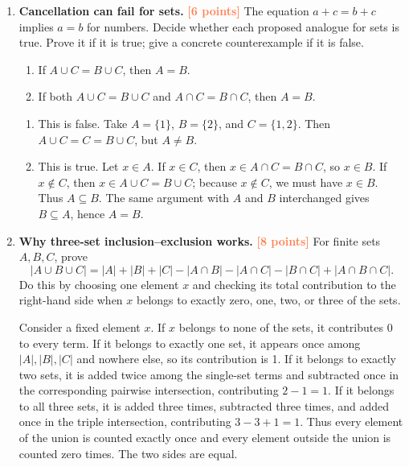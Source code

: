 \documentclass[11pt]{article}
\newcommand{\points}[1]{\hfill\textcolor{coral}{\small\bfseries[#1 points]}}
\begin{document}
\begin{enumerate}[resume]
\item \textbf{Cancellation can fail for sets.} \points{6}
The equation $a+c=b+c$ implies $a=b$ for numbers. Decide whether each proposed
analogue for sets is true. Prove it if it is true; give a concrete
counterexample if it is false.
\begin{enumerate}
  \item If $A\cup C=B\cup C$, then $A=B$.
  \item If both $A\cup C=B\cup C$ and $A\cap C=B\cap C$, then $A=B$.
\end{enumerate}
\begin{solution}
\begin{enumerate}
  \item This is false. Take $A=\{1\}$, $B=\{2\}$, and $C=\{1,2\}$.
  Then $A\cup C=C=B\cup C$, but $A\ne B$.
  \item This is true. Let $x\in A$. If $x\in C$, then
  $x\in A\cap C=B\cap C$, so $x\in B$. If $x\notin C$, then
  $x\in A\cup C=B\cup C$; because $x\notin C$, we must have $x\in B$.
  Thus $A\subseteq B$. The same argument with $A$ and $B$ interchanged gives
  $B\subseteq A$, hence $A=B$.
\end{enumerate}
\end{solution}

\item \textbf{Why three-set inclusion--exclusion works.} \points{8}
For finite sets $A,B,C$, prove
\[
|A\cup B\cup C|=|A|+|B|+|C|
-|A\cap B|-|A\cap C|-|B\cap C|+|A\cap B\cap C|.
\]
Do this by choosing one element $x$ and checking its total contribution to
the right-hand side when $x$ belongs to exactly zero, one, two, or three of
the sets.
\begin{solution}
Consider a fixed element $x$. If $x$ belongs to none of the sets, it
contributes 0 to every term. If it belongs to exactly one set, it appears once
among $|A|,|B|,|C|$ and nowhere else, so its contribution is 1. If it belongs
to exactly two sets, it is added twice among the single-set terms and
subtracted once in the corresponding pairwise intersection, contributing
$2-1=1$. If it belongs to all three sets, it is added three times, subtracted
three times, and added once in the triple intersection, contributing
$3-3+1=1$. Thus every element of the union is counted exactly once and every
element outside the union is counted zero times. The two sides are equal.
\end{solution}
\end{enumerate}
\end{document}
